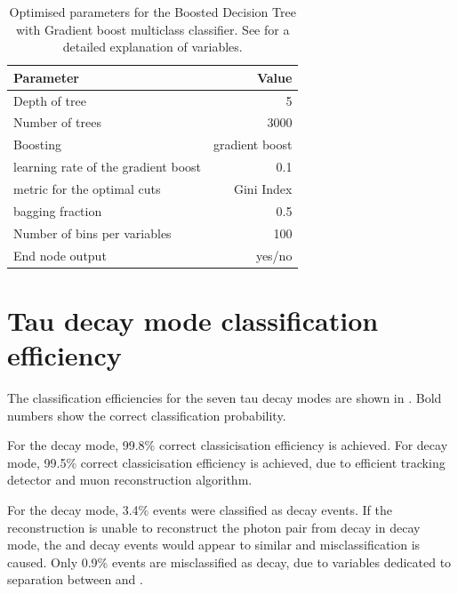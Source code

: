\begin{table}[!tbp]\centering
\begin{tabular}{lr}
\hline \hline
 Parameter &  Value \\
\hline
Depth of tree & 5 \\
Number of trees & 3000 \\
Boosting & gradient boost \\
learning rate of the gradient boost & 0.1 \\
metric for the optimal cuts & Gini Index \\
bagging fraction & 0.5 \\
Number of bins per variables & 100 \\
End node output & yes/no \\
\hline \hline
\end{tabular}

\caption
{Optimised parameters for the Boosted Decision Tree with Gradient boost multiclass classifier. See  for a detailed explanation of variables.}
\label{tab:tauBDTparameters}
\end{table}


\section{Tau decay mode classification efficiency}

The classification efficiencies for the seven tau decay modes are shown in . Bold numbers show the correct classification probability.


For the \decayElectronShort decay mode,   99.8\%  correct classicisation efficiency is achieved. For \decayMuonShort decay mode,  99.5\% correct classicisation efficiency is achieved, due to efficient tracking detector and muon reconstruction algorithm.

For the \decayPionShort decay mode, 3.4\% events were classified as \decayRhoShortest decay events. If the reconstruction is unable to reconstruct the photon pair from \Ppizero decay in \decayRhoShortest decay mode, the \decayPionShort and \decayRhoShortest decay events would appear to  similar and misclassification is caused. Only 0.9\% events are misclassified as \decayElectronShort decay, due to variables dedicated to separation between \Pem and \Ppiminus.

